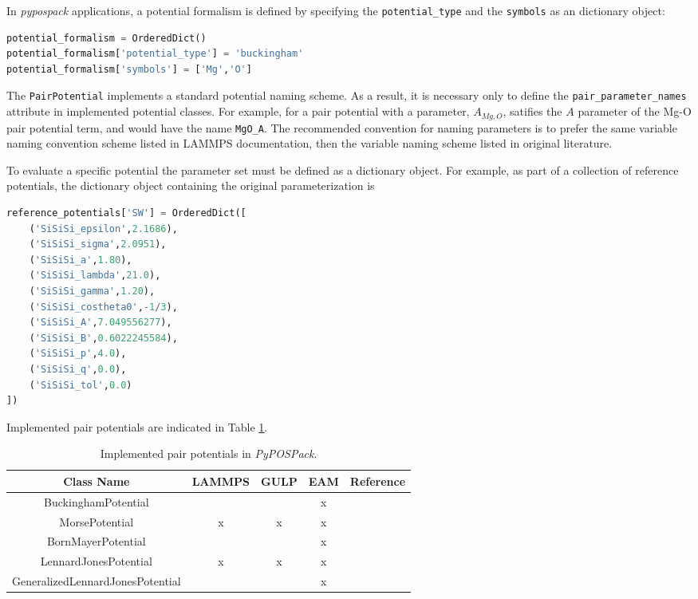 In \emph{pypospack} applications, a potential formalism is defined by specifying the \verb|potential_type| and the \verb|symbols| as an dictionary object:
\begin{lstlisting}[language=Python]
potential_formalism = OrderedDict()
potential_formalism['potential_type'] = 'buckingham'
potential_formalism['symbols'] = ['Mg','O']
\end{lstlisting}

The \verb|PairPotential| implements a standard potential naming scheme.  As a result, it is necessary only to define the \verb|pair_parameter_names| attribute in implemented potential classes.  For example, for a pair potential with a parameter, $A_{Mg,O}$, satifies the $A$ parameter of the Mg-O pair potential term, and would have the name \verb|MgO_A|.  The recommended convention for naming parameters is to prefer the same variable naming convention scheme listed in LAMMPS documentation, then the variable naming scheme listed in original literature.

To evaluate a specific potential the parameter set must be defined as a dictionary object.  For example, as part of a collection of reference potentials, the dictionary object containing the original parameterization is
\begin{lstlisting}[language=Python]
reference_potentials['SW'] = OrderedDict([
    ('SiSiSi_epsilon',2.1686),
    ('SiSiSi_sigma',2.0951),
    ('SiSiSi_a',1.80),
    ('SiSiSi_lambda',21.0),
    ('SiSiSi_gamma',1.20),
    ('SiSiSi_costheta0',-1/3),
    ('SiSiSi_A',7.049556277),
    ('SiSiSi_B',0.6022245584),
    ('SiSiSi_p',4.0),
    ('SiSiSi_q',0.0),
    ('SiSiSi_tol',0.0)
])
\end{lstlisting}

Implemented pair potentials are indicated in Table \ref{tbl:pypospack_pair_potential}.

\begin{table}[ht]
    \centering
    \caption{Implemented pair potentials in \emph{PyPOSPack}.}
    \label{tbl:pypospack_pair_potential}
    \begin{tabular}{ccccc}
	    \hline
	    {Class Name} & LAMMPS & GULP & EAM  & {Reference} \\
	    \hline
	    BuckinghamPotential   &   &   & x & \cite{lewis1985_buckingham,buckingham1938} \\
	    MorsePotential        & x & x & x & \cite{morse1929_morse_potential} \\
	    BornMayerPotential    &   &   & x & \cite{abrahamson1969_bornmayer_potential} \\
	    LennardJonesPotential & x & x & x & \cite{lennardjones1924_lj_pot} \\
	    GeneralizedLennardJonesPotential
	                          &   &   & x & \cite{mishin2004_eam_NiAl} \\
	    \hline
    \end{tabular}
\end{table}

